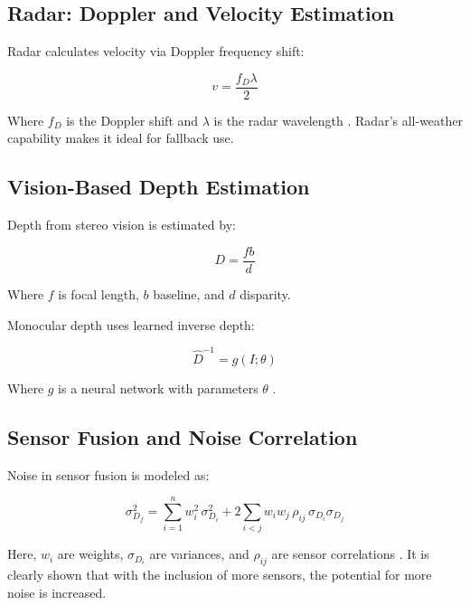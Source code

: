 \documentclass[12pt]{article}
\begin{document}
\subsection{Radar: Doppler and Velocity Estimation}

Radar calculates velocity via Doppler frequency shift:

\begin{equation}
v = \frac{f_D \lambda}{2}
\label{eq:radar_doppler}
\end{equation}

Where \( f_D \) is the Doppler shift and \( \lambda \) is the radar wavelength \cite{Han2023FourDRadarSurvey}. Radar’s all-weather capability makes it ideal for fallback use.

\subsection{Vision-Based Depth Estimation}

Depth from stereo vision is estimated by:

\begin{equation}
D = \frac{f b}{d}
\label{eq:depth_stereo}
\end{equation}

Where \( f \) is focal length, \( b \) baseline, and \( d \) disparity.

Monocular depth uses learned inverse depth:

\begin{equation}
\hat{D}^{-1} = g(I; \theta)
\label{eq:depth_mono}
\end{equation}

Where \( g \) is a neural network with parameters \( \theta \) \cite{Li2022BEVFormer}.

\subsection{Sensor Fusion and Noise Correlation}

Noise in sensor fusion is modeled as:

\begin{equation}
\sigma_{D_f}^2 = \sum_{i=1}^{n} w_i^2\,\sigma_{D_i}^2 + 2\sum_{i<j} w_i w_j\,\rho_{ij}\,\sigma_{D_i}\sigma_{D_j}
\label{eq:noise}
\end{equation}

Here, \( w_i \) are weights, \( \sigma_{D_i} \) are variances, and \( \rho_{ij} \) are sensor correlations \cite{Rana2023PerceptionSystems}. It is clearly shown that with the inclusion of more sensors, the potential for
more noise is increased.
\end{document}
